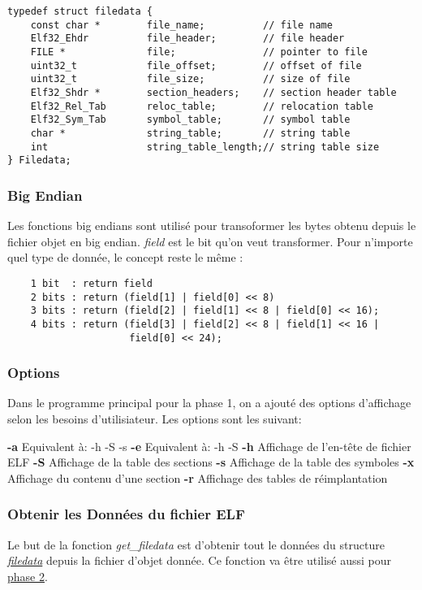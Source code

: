\documentclass[a4paper]{article} %
\begin{document}
\begin{lstlisting}
typedef struct filedata {
    const char *        file_name;          // file name
    Elf32_Ehdr          file_header;        // file header
    FILE *              file;               // pointer to file
    uint32_t            file_offset;        // offset of file
    uint32_t            file_size;          // size of file
    Elf32_Shdr *        section_headers;    // section header table
    Elf32_Rel_Tab       reloc_table;        // relocation table
    Elf32_Sym_Tab       symbol_table;       // symbol table
    char *              string_table;       // string table
    int                 string_table_length;// string table size
} Filedata;
\end{lstlisting}

\subsubsection*{Big Endian}
\label{sec:endian}
Les fonctions big endians sont utilisé pour transoformer les bytes obtenu depuis 
le fichier objet en big endian. \textit{field} est le bit qu'on veut transformer. 
Pour n'importe quel type de donnée, le concept reste le même :
\begin{lstlisting}
    1 bit  : return field 
    2 bits : return (field[1] | field[0] << 8)
    3 bits : return (field[2] | field[1] << 8 | field[0] << 16);
    4 bits : return (field[3] | field[2] << 8 | field[1] << 16 | 
                     field[0] << 24);
\end{lstlisting}

\subsubsection*{Options}
\label{sec:options}
Dans le programme principal pour la phase 1, on a ajouté des options d'affichage 
selon les besoins d'utilisiateur. Les options sont les suivant:

\tabto{3em} \textbf{-a} \tabto{10em} Equivalent à: -h -S -s
\tabto{3em} \textbf{-e} \tabto{10em} Equivalent à: -h -S
\tabto{3em} \textbf{-h} \tabto{10em} Affichage de l'en-tête de fichier ELF
\tabto{3em} \textbf{-S} \tabto{10em} Affichage de la table des sections
\tabto{3em} \textbf{-s} \tabto{10em} Affichage de la table des symboles
\tabto{3em} \textbf{-x} \tabto{10em} Affichage du contenu d'une section
\tabto{3em} \textbf{-r} \tabto{10em} Affichage des tables de réimplantation

\subsubsection*{Obtenir les Données du fichier ELF}
\label{sec:data}
Le but de la fonction \textit{get\_filedata} est d'obtenir tout le données du 
structure \hyperref[sec:filedata]{\textit{filedata}} depuis la fichier d'objet donnée. Ce fonction va être 
utilisé aussi pour \hyperref[sec:phase2]{phase 2}. 
\end{document}

